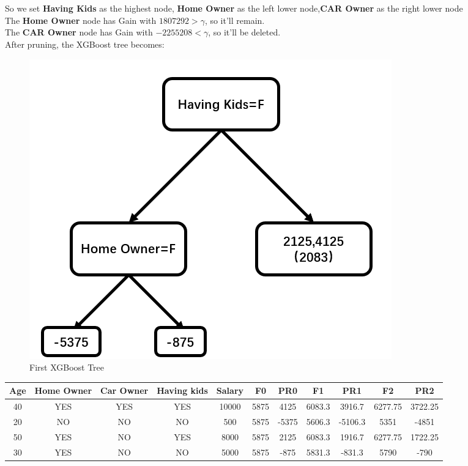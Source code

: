 \documentclass[a4paper]{article}
\begin{document}
\begin{itemize}
        \\\\So we set \textbf{Having Kids} as the highest node, \textbf{Home Owner} as the left lower node,\textbf{CAR Owner} as the right lower node
        \\The \textbf{Home Owner} node has Gain with $1807292>\gamma$, so it'll remain.
        \\The \textbf{CAR Owner} node has Gain with $-2255208<\gamma$, so it'll be deleted.
        \\After pruning, the XGBoost tree becomes:
        \begin{figure}[H]
            \centering
            \includegraphics[scale=0.25]{P2.png}
            \caption{First XGBoost Tree}
            \label{P2}
        \end{figure}
        \begin{table}[htbp]
            \begin{tabular}{|c|c|c|c|c|c|c|c|c|c|c|}
                \hline
                Age & Home Owner & Car Owner & Having kids & Salary & F0 & PR0 & F1 & PR1 & F2 & PR2\\ \hline
                40 & YES & YES & YES & 10000 & 5875 & 4125 & 6083.3 & 3916.7 & 6277.75 & 3722.25\\ \hline
                20 & NO & NO & NO & 500 & 5875 & -5375 & 5606.3 & -5106.3 & 5351 & -4851\\ \hline
                50 & YES & NO & YES & 8000 & 5875 & 2125 & 6083.3 & 1916.7 & 6277.75 & 1722.25\\ \hline
                30 & YES & NO & NO & 5000 & 5875 & -875 & 5831.3 & -831.3 & 5790 & -790\\ \hline
                \end{tabular}
            \end{table}
\end{itemize}
\end{document}
